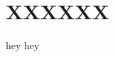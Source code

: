 \chapter{XXXXXX}
\thispagestyle{plain}  %
\pagestyle{chapterpages}
\label{Section:Chapter4}

\minitoc

hey hey